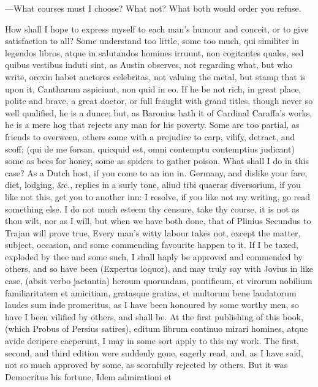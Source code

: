 {---What courses must I choose?
What not? What both would order you refuse.

How shall I hope to express myself to each man's humour and
conceit, or to give satisfaction to all? Some understand too
little, some too much, qui similiter in legendos libros, atque in
salutandos homines irruunt, non cogitantes quales, sed quibus vestibus
induti sint, as Austin observes, not regarding what, but who
write, orexin habet auctores celebritas, not valuing the metal,
but stamp that is upon it, Cantharum aspiciunt, non quid in eo. If he
be not rich, in great place, polite and brave, a great doctor, or full
fraught with grand titles, though never so well qualified, he is a
dunce; but, as Baronius hath it of Cardinal Caraffa's works, he is
a mere hog that rejects any man for his poverty. Some are too partial,
as friends to overween, others come with a prejudice to carp, vilify,
detract, and scoff; (qui de me forsan, quicquid est, omni contemptu
contemptius judicant) some as bees for honey, some as spiders to gather
poison. What shall I do in this case? As a Dutch host, if you come to
an inn in. Germany, and dislike your fare, diet, lodging, \&c., replies
in a surly tone, aliud tibi quaeras diversorium, if you like not
this, get you to another inn: I resolve, if you like not my writing, go
read something else. I do not much esteem thy censure, take thy course,
it is not as thou wilt, nor as I will, but when we have both done, that
of Plinius Secundus to Trajan will prove true, Every man's witty
labour takes not, except the matter, subject, occasion, and some
commending favourite happen to it. If I be taxed, exploded by thee and
some such, I shall haply be approved and commended by others, and so
have been (Expertus loquor), and may truly say with Jovius in like
case, (absit verbo jactantia) heroum quorundam, pontificum, et virorum
nobilium familiaritatem et amicitiam, gratasque gratias, et multorum
 bene laudatorum laudes sum inde promeritus, as I have been
honoured by some worthy men, so have I been vilified by others, and
shall be. At the first publishing of this book, (which Probus of
Persius satires), editum librum continuo mirari homines, atque avide
deripere caeperunt, I may in some sort apply to this my work. The
first, second, and third edition were suddenly gone, eagerly read, and,
as I have said, not so much approved by some, as scornfully rejected by
others. But it was Democritus his fortune, Idem admirationi et
}
